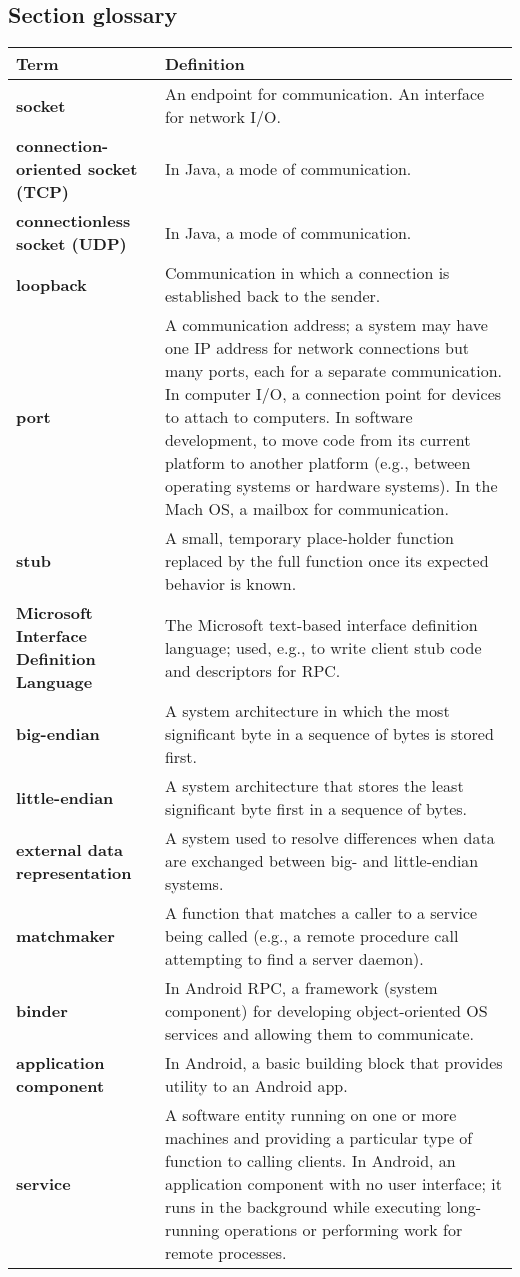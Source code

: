 \subsection*{Section glossary}
\centering
\begin{tabular}{>{\raggedright}p{} >{\raggedright\arraybackslash}p{}}
\toprule
\textbf{Term} & \textbf{Definition} \\
\midrule
\textbf{socket} & An endpoint for communication. An interface for network I/O. \\
\textbf{connection-oriented socket (TCP)} & In Java, a mode of communication. \\
\textbf{connectionless socket (UDP)} & In Java, a mode of communication. \\
\textbf{loopback} & Communication in which a connection is established back to the sender. \\
\textbf{port} & A communication address; a system may have one IP address for network connections but many ports, each for a separate communication. In computer I/O, a connection point for devices to attach to computers. In software development, to move code from its current platform to another platform (e.g., between operating systems or hardware systems). In the Mach OS, a mailbox for communication. \\
\textbf{stub} & A small, temporary place-holder function replaced by the full function once its expected behavior is known. \\
\textbf{Microsoft Interface Definition Language} & The Microsoft text-based interface definition language; used, e.g., to write client stub code and descriptors for RPC. \\
\textbf{big-endian} & A system architecture in which the most significant byte in a sequence of bytes is stored first. \\
\textbf{little-endian} & A system architecture that stores the least significant byte first in a sequence of bytes. \\
\textbf{external data representation} & A system used to resolve differences when data are exchanged between big- and little-endian systems. \\
\textbf{matchmaker} & A function that matches a caller to a service being called (e.g., a remote procedure call attempting to find a server daemon). \\
\textbf{binder} & In Android RPC, a framework (system component) for developing object-oriented OS services and allowing them to communicate. \\
\textbf{application component} & In Android, a basic building block that provides utility to an Android app. \\
\textbf{service} & A software entity running on one or more machines and providing a particular type of function to calling clients. In Android, an application component with no user interface; it runs in the background while executing long-running operations or performing work for remote processes. \\
\bottomrule
\end{tabular}
\vspace{\baselineskip}
